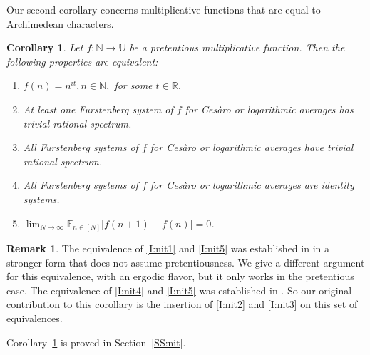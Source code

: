 \documentclass[11pt]{amsart}
\newtheorem{corollary}[lemma]{Corollary}
\theoremstyle{definition}
\newtheorem*{remark}{Remark}
\newcommand{\E}{{\mathbb E}}
\newcommand{\N}{{\mathbb N}}
\newcommand{\R}{{\mathbb R}}
\newcommand{\U}{{\mathbb U}}
\begin{document}
 Our second corollary concerns multiplicative functions that are equal to Archimedean characters.
\begin{corollary}\label{C:nit}
	Let $f\colon \N\to \U$ be a pretentious multiplicative function. Then the following properties are equivalent:
	\begin{enumerate}
		\item\label{I:nit1}  $f(n)=n^{it}, n\in \N,$ for some $t\in \R$.
		
		\smallskip
		
		\item\label{I:nit2}  At least one Furstenberg system of  	$f$ for Ces\`aro  or logarithmic averages has trivial rational spectrum.
		
		\smallskip
		
		\item\label{I:nit3}  All Furstenberg systems of  	$f$ for Ces\`aro  or logarithmic averages have trivial rational spectrum.
		
		\smallskip
		
		\item\label{I:nit4}  All Furstenberg systems of  	$f$ for Ces\`aro  or logarithmic averages are identity systems.
		
		\smallskip
		
		\item\label{I:nit5}  	$\lim_{N\to\infty}\E_{n\in[N]}|f(n+1)-f(n)|=0$.
	\end{enumerate}
\end{corollary}
\begin{remark}
	The equivalence   of \eqref{I:nit1} and \eqref{I:nit5} was established in \cite[Theorem~1.8]{Kl17}  in a stronger form  that does not assume pretentiousness.  We give a different argument for this equivalence, with   an ergodic flavor, but it only works in the pretentious case. The equivalence  of \eqref{I:nit4} and \eqref{I:nit5} was established in  \cite[Proposition~5.1]{GLR21}. So our original contribution to this corollary is the insertion of \eqref{I:nit2} and \eqref{I:nit3} on this set of  equivalences.
\end{remark}
Corollary~\ref{C:nit} is proved in Section~\ref{SS:nit}.
\end{document}
